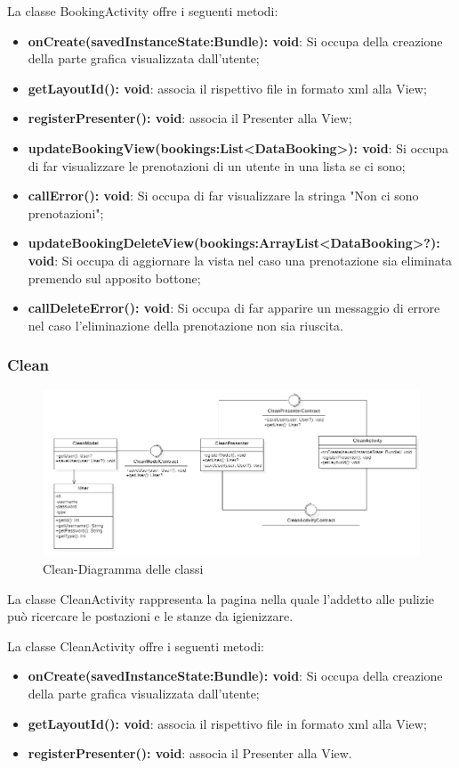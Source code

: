 La classe BookingActivity offre i seguenti metodi:
\begin{itemize}
	\item \textbf{onCreate(savedInstanceState:Bundle): void}: Si occupa della creazione della parte grafica visualizzata dall'utente; 
	\item \textbf{getLayoutId(): void}: associa il rispettivo file in formato xml alla View;
	\item \textbf{registerPresenter(): void}: associa il Presenter alla View;
	\item \textbf{updateBookingView(bookings:List<DataBooking>): void}: Si occupa di far visualizzare le prenotazioni di un utente in una lista se ci sono;
	\item \textbf{callError(): void}: Si occupa di far visualizzare la stringa "Non ci sono prenotazioni";
	\item \textbf{updateBookingDeleteView(bookings:ArrayList<DataBooking>?): void}: Si occupa di aggiornare la vista nel caso una prenotazione sia eliminata premendo sul apposito bottone;
	\item \textbf{callDeleteError(): void}: Si occupa di far apparire un messaggio di errore nel caso l'eliminazione della prenotazione non sia riuscita.
\end{itemize}

\subsubsection{Clean}
\begin{figure}[H]
	\centering
	\includegraphics[width=16cm]{res/images/Clean.png}
	\caption{Clean-Diagramma delle classi}
	\label{fig:Clean-Diagramma delle classi}
\end{figure}
La classe CleanActivity rappresenta la pagina nella quale l'addetto alle pulizie può ricercare le postazioni e le stanze da igienizzare.

La classe CleanActivity offre i seguenti metodi:
\begin{itemize}
	\item \textbf{onCreate(savedInstanceState:Bundle): void}: Si occupa della creazione della parte grafica visualizzata dall'utente; 
	\item \textbf{getLayoutId(): void}: associa il rispettivo file in formato xml alla View;
	\item \textbf{registerPresenter(): void}: associa il Presenter alla View.
\end{itemize}

